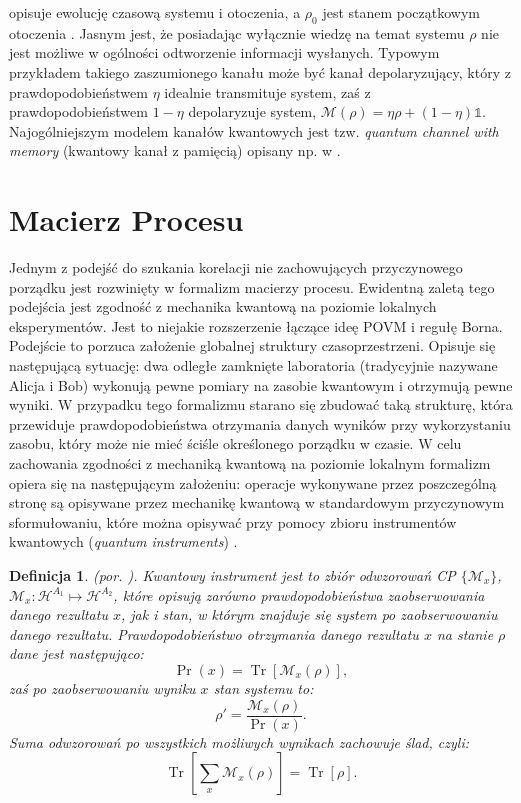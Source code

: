\documentclass[10pt]{article} %
\newtheorem{definicja}{Definicja}
\DeclareMathOperator{\Trs}{Tr}
\newcommand{\Hx}[1]{\mathcal{H}^{#1}}
\newcommand{\I}{\mathbb{1}}
\begin{document}
opisuje ewolucję czasową systemu i otoczenia, a $\rho_0$ jest stanem początkowym otoczenia \cite{fund}. Jasnym jest, że posiadając wyłącznie wiedzę na temat systemu $\rho$ nie jest możliwe w ogólności odtworzenie informacji wysłanych.
Typowym przykładem takiego zaszumionego kanału może być kanał depolaryzujący, który z prawdopodobieństwem $\eta$ idealnie transmituje system, zaś z prawdopodobieństwem $1-\eta$ depolaryzuje system, $\mathcal{M}(\rho) = \eta\rho+(1-\eta)\I$. Najogólniejszym modelem kanałów kwantowych jest tzw.
\textit{quantum channel with memory} (kwantowy kanał z pamięcią) opisany np. w \cite{memory}.

\section{Macierz Procesu}
\label{macierz_procesu}
Jednym z podejść do szukania korelacji nie zachowujących przyczynowego porządku jest rozwinięty w \cite{process_matrix} formalizm macierzy procesu.
Ewidentną zaletą tego podejścia jest zgodność z mechanika kwantową na poziomie lokalnych eksperymentów. Jest to niejakie rozszerzenie łączące ideę POVM i regułę Borna. Podejście to porzuca założenie globalnej struktury czasoprzestrzeni. Opisuje się następującą sytuację: dwa odległe zamknięte laboratoria (tradycyjnie nazywane Alicja i Bob) wykonują pewne pomiary na zasobie kwantowym i otrzymują pewne wyniki. W przypadku tego formalizmu starano się zbudować taką strukturę, która przewiduje prawdopodobieństwa otrzymania danych wyników przy wykorzystaniu zasobu, który może nie mieć ściśle określonego porządku w czasie. W celu zachowania zgodności z mechaniką kwantową na poziomie lokalnym formalizm opiera się na następującym założeniu: operacje wykonywane przez poszczególną stronę są opisywane przez mechanikę kwantową w standardowym przyczynowym sformułowaniu, które można opisywać przy pomocy zbioru instrumentów kwantowych (\textit{quantum instruments}) \cite{quantum_instrument}. 
\begin{definicja}
(por. \cite{quantum_instrument}).
Kwantowy instrument jest to zbiór odwzorowań CP $\{\mathcal{M}_x\}$, $\mathcal{M}_x: \Hx{A_1}\mapsto \Hx{A_2}$, które opisują zarówno prawdopodobieństwa zaobserwowania danego rezultatu $x$, jak i stan, w którym znajduje się system po zaobserwowaniu danego rezultatu. Prawdopodobieństwo otrzymania danego rezultatu $x$ na stanie $\rho$ dane jest następująco:
\begin{equation}
\Pr(x) = \Trs\left[\mathcal{M}_x(\rho)\right],
\end{equation} zaś po zaobserwowaniu wyniku $x$ stan systemu to:
\begin{equation}
\rho' = \frac{\mathcal{M}_x(\rho)}{\Pr(x)}.
\end{equation} Suma odwzorowań po wszystkich możliwych wynikach zachowuje ślad, czyli:
\begin{equation}
\Trs \left[ \sum_x \mathcal{M}_x(\rho) \right] = \Trs\left[\rho\right].
\end{equation}
\end{definicja}
\end{document}
